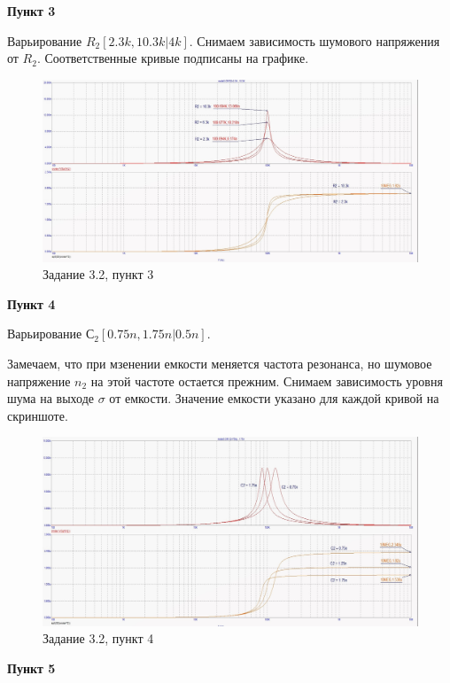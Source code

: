 \documentclass[a4paper, 14pt]{extarticle}%
\begin{document}
\textbf{Пункт 3}
\newline

Варьирование $R_2[2.3k, 10.3k | 4k]$.
Снимаем зависимость шумового напряжения от $R_2$. Соответственные кривые подписаны на графике. 

\begin{figure}[h!]
			\centering
			\includegraphics[width=1.1\linewidth]{3/3_2_5.jpg}
			\caption{Задание 3.2, пункт 3}
			\label{A}
\end{figure}

\textbf{Пункт 4}
\newline

Варьирование $С_2[0.75n, 1.75n | 0.5n]$.

Замечаем, что при мзенении емкости меняется частота резонанса, но шумовое напряжение $n_2$ на этой частоте остается прежним.
Снимаем зависимость уровня шума на выходе $\sigma$ от емкости. 
Значение емкости указано для каждой кривой на скриншоте.

\begin{figure}[h!]
			\centering
			\includegraphics[width=1.1\linewidth]{3/3_2_3.jpg}
			\caption{Задание 3.2, пункт 4}
			\label{A}
\end{figure}


\textbf{Пункт 5}
\newline
\end{document}
